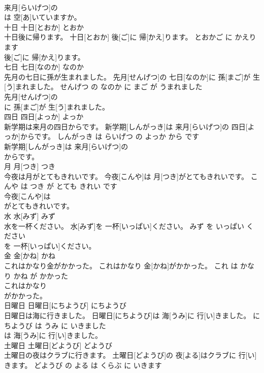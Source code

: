 \documentclass[8pt]{extreport}
\begin{document}
\begin{CJK}{UTF8}{min}
\\	来月[らいげつ]の
\\	は 空[あ]いていますか。			
\\	十日	十日[とおか]	とおか	
\\	十日後に帰ります。	十日[とおか] 後[ご]に 帰[かえ]ります。	とおかご に かえります	
\\	後[ご]に 帰[かえ]ります。			
\\	七日	七日[なのか]	なのか	
\\	先月の七日に孫が生まれました。	先月[せんげつ]の 七日[なのか]に 孫[まご]が 生[う]まれました。	せんげつ の なのか に まご が うまれました	
\\	先月[せんげつ]の
\\	に 孫[まご]が 生[う]まれました。			
\\	四日	四日[よっか]	よっか	
\\	新学期は来月の四日からです。	新学期[しんがっき]は 来月[らいげつ]の 四日[よっか]からです。	しんがっき は らいげつ の よっか から です	
\\	新学期[しんがっき]は 来月[らいげつ]の
\\	からです。			
\\	月	月[つき]	つき	
\\	今夜は月がとてもきれいです。	今夜[こんや]は 月[つき]がとてもきれいです。	こんや は つき が とても きれい です	
\\	今夜[こんや]は
\\	がとてもきれいです。			
\\	水	水[みず]	みず	
\\	水を一杯ください。	水[みず]を 一杯[いっぱい]ください。	みず を いっぱい ください	
\\	を 一杯[いっぱい]ください。			
\\	金	金[かね]	かね	
\\	これはかなり金がかかった。	これはかなり 金[かね]がかかった。	これ は かなり かね が かかった	
\\	これはかなり
\\	がかかった。			
\\	日曜日	日曜日[にちようび]	にちようび	
\\	日曜日は海に行きました。	日曜日[にちようび]は 海[うみ]に 行[い]きました。	にちようび は うみ に いきました	
\\	は 海[うみ]に 行[い]きました。			
\\	土曜日	土曜日[どようび]	どようび	
\\	土曜日の夜はクラブに行きます。	土曜日[どようび]の 夜[よる]はクラブに 行[い]きます。	どようび の よる は くらぶ に いきます	

\end{CJK}
\end{document}
